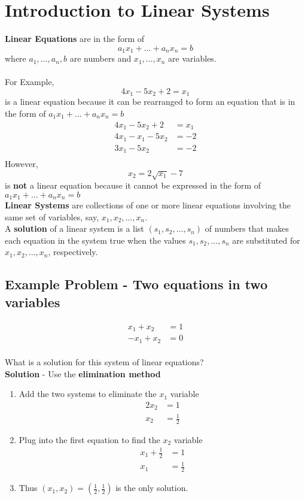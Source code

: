 \section{Introduction to Linear Systems}
\textbf{Linear Equations} are in the form of
\[
  a_{1}x_{1} + \dots + a_{n}x_{n} = b
\]
where $a_1,\dots,a_n,b$ are numbers and $x_1,\dots,x_n$ are variables. \\\\
For Example,
\[
  4x_1 - 5x_2 + 2 = x_1
\]
is a linear equation because it can be rearranged to form an equation that is in the form of $a_{1}x_{1} + \dots + a_{n}x_{n} = b$
\[
\begin{aligned}
  4x_1 - 5x_2 + 2 &= x_1 \\
  4x_1 - x_1 - 5x_2 &= -2 \\
  3x_1 - 5x_2 &= -2 \\
\end{aligned}
\]
However,
\[
  x_2 = 2\sqrt{x_1} - 7
\]
is \textbf{not} a linear equation because it cannot be expressed in the form of $a_{1}x_{1} + \dots + a_{n}x_{n} = b$
\\[8pt]
\textbf{Linear Systems} are collections of one or more linear equations involving the same set of variables, say, $x_1, x_2, \dots, x_n$.
\\[8pt]
A \textbf{solution} of a linear system is a list $(s_1,s_2,\dots,s_n)$ of numbers that makes each equation in the system true when the values $s_1, s_2, \dots, s_n$ are substituted for $x_1, x_2, \dots, x_n$, respectively.
\subsection{Example Problem - Two equations in two variables}
\[
  \begin{aligned}
    x_1 + x_2 &= 1 \\
    -x_1 + x_2 &= 0
  \end{aligned}
\]
\\[8pt]
What is a solution for this system of linear equations?
\\[8pt]
\textbf{Solution} - Use the \textbf{elimination method}
\begin{enumerate}
  \item Add the two systems to eliminate the $x_1$ variable
  \[
    \begin{aligned}
      2x_2 &= 1 \\
      x_2 &= \frac{1}{2}
    \end{aligned}
  \]
  \item Plug into the first equation to find the $x_2$ variable
  \[
    \begin{aligned}
      x_1 + \frac{1}{2} &= 1 \\
      x_1 &= \frac{1}{2}
    \end{aligned}
  \]
  \item Thus $(x_1, x_2) = (\frac{1}{2},\frac{1}{2})$ is the only solution. 
\end{enumerate}

